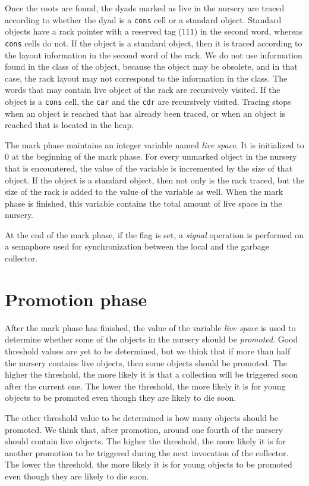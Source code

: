 Once the roots are found, the dyads marked as live in the nursery are
traced according to whether the dyad is a \texttt{cons} cell or a
standard object.  Standard objects have a rack pointer with a reserved
tag ($111$) in the second word, whereas \texttt{cons} cells do not.
If the object is a standard object, then it is traced according to the
layout information in the second word of the rack.  We do not use
information found in the class of the object, because the object may
be obsolete, and in that case, the rack layout may not correspond to
the information in the class.  The words that may contain live object
of the rack are recursively visited.  If the object is a \texttt{cons}
cell, the \texttt{car} and the \texttt{cdr} are recursively visited.
Tracing stops when an object is reached that has already been traced,
or when an object is reached that is located in the heap.

The mark phase maintains an integer variable named \emph{live space}.
It is initialized to $0$ at the beginning of the mark phase.  For
every unmarked object in the nursery that is encountered, the value of
the variable is incremented by the size of that object.  If the object
is a standard object, then not only is the rack traced, but the size
of the rack is added to the value of the variable as well.  When the
mark phase is finished, this variable contains the total amount of
live space in the nursery.

At the end of the mark phase, if the flag is set, a \emph{signal}
operation is performed on a semaphore used for synchronization between
the local and the garbage collector.

\section{Promotion phase}

After the mark phase has finished, the value of the variable
\emph{live space} is used to determine whether some of the
objects in the nursery should be \emph{promoted}.  Good threshold
values are yet to be determined, but we think that if more than half
the nursery contains live objects, then some objects should be
promoted.  The higher the threshold, the more likely it is that a
collection will be triggered soon after the current one.  The lower
the threshold, the more likely it is for young objects to be promoted
even though they are likely to die soon.

The other threshold value to be determined is how many objects should
be promoted.  We think that, after promotion, around one fourth of the
nursery should contain live objects.  The higher the threshold, the
more likely it is for another promotion to be triggered during the
next invocation of the collector.  The lower the threshold, the more
likely it is for young objects to be promoted even though they are
likely to die soon.

